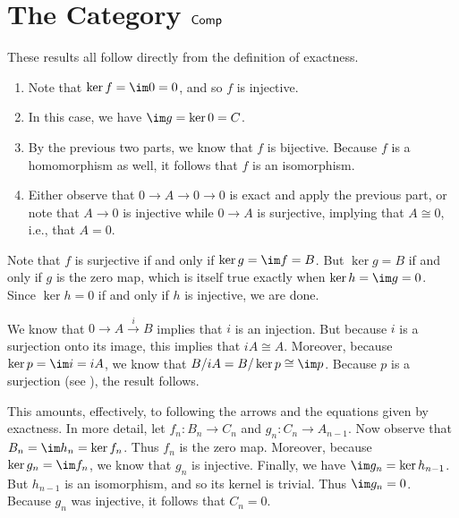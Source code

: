 \documentclass[../../solutions.tex]{subfiles}
\begin{document}
\section{\texorpdfstring{The Category $\mathsf{Comp}$}{The Category Comp}}
\begin{exercise} \leavevmode
These results all follow directly from the definition of exactness. 
\begin{enumerate}
\item Note that $\ker f=\im 0=0$, and so $f$ is injective. 
\item In this case, we have $\im g=\ker0=C$. 
\item By the previous two parts, we know that $f$ is bijective. 
Because $f$ is a homomorphism as well, it follows that $f$ is an isomorphism. 
\item Either observe that $0\to A\to0\to0$ is exact and apply the previous part, or note that $A\to0$ is injective while $0\to A$ is surjective, implying that $A\cong0$, i.e., that $A=0$. 
\end{enumerate}
\end{exercise}

\begin{exercise} \leavevmode
Note that $f$ is surjective if and only if $\ker g=\im f=B$. 
But $\ker g=B$ if and only if $g$ is the zero map, which is itself true exactly when $\ker h=\im g=0$. 
Since $\ker h=0$ if and only if $h$ is injective, we are done. 
\end{exercise}

\begin{exercise} \leavevmode
We know that $0\to A\xrightarrow{i}B$ implies that $i$ is an injection. 
But because $i$ is a surjection onto its image, this implies that $iA\cong A$. 
Moreover, because $\ker p=\im i=iA$, we know that $B/iA=B/\ker p\cong\im p$. 
Because $p$ is a surjection (see ), the result follows. 
\end{exercise}

\begin{exercise} \leavevmode
This amounts, effectively, to following the arrows and the equations given by exactness. 
In more detail, let $f_n:B_n\to C_n$ and $g_n:C_n\to A_{n-1}$. 
Now observe that $B_n=\im h_n=\ker f_n$. 
Thus $f_n$ is the zero map. 
Moreover, because $\ker g_n=\im f_n$, we know that $g_n$ is injective. 
Finally, we have $\im g_n=\ker h_{n-1}$. 
But $h_{n-1}$ is an isomorphism, and so its kernel is trivial. 
Thus $\im g_n=0$. 
Because $g_n$ was injective, it follows that $C_n=0$. 
\end{exercise}
\end{document}
